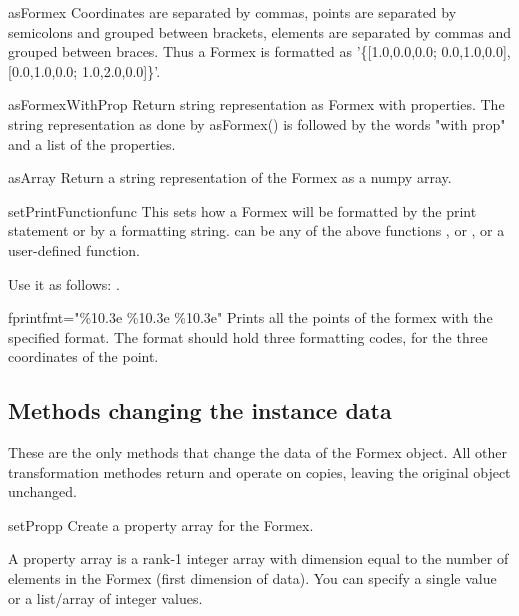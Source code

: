 {{\begin{methoddesc}{asFormex}{}
Coordinates are separated by commas, points are separated by semicolons and grouped between brackets, elements are separated by commas and grouped between braces. Thus a Formex  is formatted as '\{[1.0,0.0,0.0; 0.0,1.0,0.0], [0.0,1.0,0.0; 1.0,2.0,0.0]\}'.
\end{methoddesc}

\begin{methoddesc}{asFormexWithProp}{}
Return string representation as Formex with properties. The string representation as done by asFormex() is followed by the words "with prop" and a list of the properties.
\end{methoddesc}
              
\begin{methoddesc}{asArray}{}
Return a string representation of the Formex as a numpy array.
\end{methoddesc}

\begin{methoddesc}{setPrintFunction}{func}
This sets how a Formex will be formatted by the print statement or by a  formatting string.  can be any of the above functions ,  or , or a user-defined function. 

\classmethod
Use it as follows: .
\end{methoddesc}


\begin{methoddesc}{fprint}{fmt="\%10.3e \%10.3e \%10.3e"}
Prints all the points of the formex with the specified format. The format should hold three formatting codes, for the three coordinates of the point. 
\end{methoddesc}


\subsection{Methods changing the instance data}
These are the only methods that change the data of the Formex object. All other transformation methodes return and operate on copies, leaving the original object unchanged.

\begin{methoddesc}{setProp}{p}
Create a property array for the Formex.

A property array is a rank-1 integer array with dimension equal to the number of elements in the Formex (first dimension of data). You can specify a single value or a list/array of integer values.


\end{methoddesc}}}
